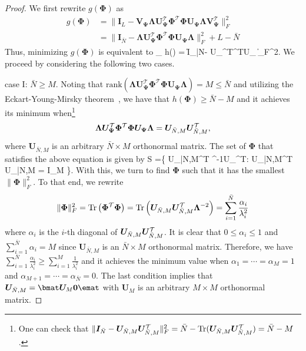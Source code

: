 \documentclass[final,5p,times,twocolumn]{elsarticle}
\begin{document}
\begin{proof}
	We first rewrite $g({\bm \Phi})$ as
	\begin{align*}
	g(\bm \Phi) &= \|\bm I_L- \bm V_{\bm\Psi}\bm \Lambda\bm U_{\bm\Psi}^\mathcal T\bm\Phi^\mathcal T\bm\Phi \bm U_{\bm\Psi} \bm \Lambda\bm V_{\bm\Psi}^\mathcal T \|_F^2\\
	&= \|\bm I_{\bar N}- \bm \Lambda\bm U_{\bm\Psi}^\mathcal T\bm\Phi^\mathcal T\bm\Phi \bm U_{\bm\Psi} \bm \Lambda \|_F^2 + L - \bar N
	\end{align*}
	Thus, minimizing $g(\bm \Phi)$ is equivalent to
	\e
	\min_{\bm\Phi} h(\bm \Phi) = \|\bm I_{\bar N}- \bm \Lambda\bm U_{\bm\Psi}^\mathcal T\bm\Phi^\mathcal T\bm\Phi \bm U_{\bm\Psi} \bm \Lambda \|_F^2.
	\label{eq:h}\ee
	We proceed by considering the following two cases.
	
	case I: $ \bar N\geq M$. Noting that $\text{rank}(\bm \Lambda\bm U_{\bm\Psi}^\mathcal T\bm\Phi^\mathcal T\bm\Phi \bm U_{\bm\Psi} \bm \Lambda) = M \leq \bar N$ and utilizing the Eckart-Young-Mirsky theorem~\cite{RC13}, we have that $h(\bm \Phi)\geq \bar N - M$
	and it achieves its minimum when\footnote{One can check that $\|\bm I_{\bar N} - \bm U_{\bar N,M}\bm U_{\bar N,M}^{\cal T}\|_F^2 = \bar N -  \text{Tr}(\bm U_{\bar N,M}\bm U_{\bar N,M}^{\cal T}) = \bar N - M$.}
	\[
	\bm \Lambda\bm U_{\bm\Psi}^\mathcal T\bm\Phi^\mathcal T\bm\Phi \bm U_{\bm\Psi} \bm \Lambda = \bm U_{\bar N,M}\bm U_{\bar N,M}^{\cal T},
	\]
	where $\bm U_{\bar N,M}$ is an arbitrary $\bar N\times M$ orthonormal matrix.
	The set of $\bm \Phi$ that satisfies the above equation is given by
	\e
	\bm \Phi \in \mathcal S =\left\{ \bm U_{\bar N,M}^{\cal T} \bm\Lambda^{-1}\bm U_{\bm \Psi}^\mathcal T: \bm U_{\bar N,M}^{\cal T} \bm U_{\bar N,M} = \bm I_M \right\}.
	\label{eq:def S 1}\ee
	With this, we turn to find $\bm \Phi$ such that it has the smallest $\|\bm \Phi\|_F^2$. To that end, we rewrite
	$$
	\|\bm \Phi\|_F^2 =\text{Tr}\left(\bm\Phi^\mathcal T\bm\Phi\right)=\text{Tr}\left(\bm U_{\bar N,M}\bm U_{\bar N,M}^{\cal T} \bm\Lambda^{-2}  \right)=\sum_{i=1}^{\bar N} \frac{\alpha_i}{\lambda_i^2}\\
	$$
	where $\alpha_i$ is the $i$-th diagonal of $\bm U_{\bar N,M}\bm U_{\bar N,M}^{\cal T}$. It is clear that $0\leq \alpha_i\leq 1$ and $\sum_{i=1}^{\bar N} \alpha_i = M$ since $\bm U_{\bar N,M}$ is an $\bar N\times M$ orthonormal matrix. Therefore, we have
	$
	\sum_{i=1}^{\bar N} \frac{\alpha_i}{\lambda_i^2} \geq \sum_{i=1}^{M}\frac{1}{\lambda_i^2}
	$
	and it achieves the minimum value when $\alpha_1 = \cdots = \alpha_M = 1$ and $\alpha_{M+1} = \cdots = \alpha_{\bar N} = 0$. The last condition implies that $\bm U_{\bar N,M} = \bmat \bm U_M\\ \bm 0\emat$ with $\bm U_M$ is an arbitrary  $M\times M$ orthonormal matrix.
	

\end{proof}
\end{document}
